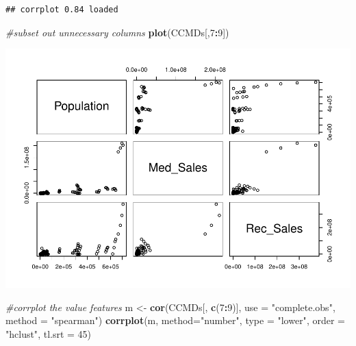 \documentclass[]{article}
\newenvironment{Shaded}{\begin{snugshade}}{\end{snugshade}}
\newcommand{\CommentTok}[1]{\textcolor[rgb]{0.56,0.35,0.01}{\textit{#1}}}
\newcommand{\DataTypeTok}[1]{\textcolor[rgb]{0.13,0.29,0.53}{#1}}
\newcommand{\DecValTok}[1]{\textcolor[rgb]{0.00,0.00,0.81}{#1}}
\newcommand{\KeywordTok}[1]{\textcolor[rgb]{0.13,0.29,0.53}{\textbf{#1}}}
\newcommand{\NormalTok}[1]{#1}
\newcommand{\OperatorTok}[1]{\textcolor[rgb]{0.81,0.36,0.00}{\textbf{#1}}}
\newcommand{\StringTok}[1]{\textcolor[rgb]{0.31,0.60,0.02}{#1}}
\begin{document}
\begin{verbatim}
## corrplot 0.84 loaded
\end{verbatim}

\begin{Shaded}
\begin{Highlighting}[]
\CommentTok{#subset out unnecessary columns}
\KeywordTok{plot}\NormalTok{(CCMDs[,}\DecValTok{7}\OperatorTok{:}\DecValTok{9}\NormalTok{])}
\end{Highlighting}
\end{Shaded}

\includegraphics{01-Build_DS_and_EDA_files/figure-latex/unnamed-chunk-5-1.pdf}

\begin{Shaded}
\begin{Highlighting}[]
\CommentTok{#corrplot the value features}
\NormalTok{m <-}\StringTok{ }\KeywordTok{cor}\NormalTok{(CCMDs[, }\KeywordTok{c}\NormalTok{(}\DecValTok{7}\OperatorTok{:}\DecValTok{9}\NormalTok{)], }\DataTypeTok{use =} \StringTok{"complete.obs"}\NormalTok{, }\DataTypeTok{method =} \StringTok{"spearman"}\NormalTok{)}
\KeywordTok{corrplot}\NormalTok{(m, }\DataTypeTok{method=}\StringTok{"number"}\NormalTok{, }\DataTypeTok{type =} \StringTok{"lower"}\NormalTok{, }\DataTypeTok{order =} \StringTok{"hclust"}\NormalTok{, }\DataTypeTok{tl.srt =} \DecValTok{45}\NormalTok{)}
\end{Highlighting}
\end{Shaded}
\end{document}
